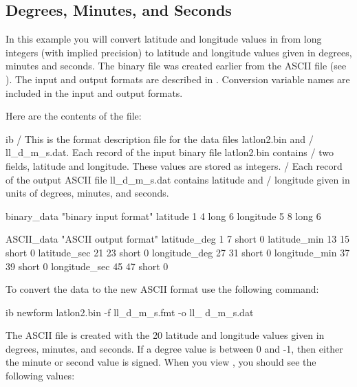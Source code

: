 \subsection{Degrees, Minutes, and Seconds}
\label{ff,convvars,dms}


In this example you will convert latitude and longitude values in
 from long integers (with implied precision) to
latitude and longitude values given in degrees, minutes and seconds.
The binary file  was created earlier from the ASCII
file  (see ). The input and
output formats are described in . Conversion
variable names are included in the input and output formats.

Here are the contents of the  file:

\begin{vcode}{ib}
/ This is the format description file for the data files latlon2.bin and
/ ll_d_m_s.dat. Each record of the input binary file latlon2.bin contains 
/ two fields, latitude and longitude. These values are stored as integers.
/ Each record of the output ASCII file ll_d_m_s.dat contains latitude and 
/ longitude given in units of degrees, minutes, and seconds.

binary_data "binary input format"
latitude 1 4 long 6
longitude 5 8 long 6

ASCII_data "ASCII output format"
latitude_deg 1 7 short 0
latitude_min 13 15 short 0
latitude_sec 21 23 short 0
longitude_deg 27 31 short 0
longitude_min 37 39 short 0
longitude_sec 45 47 short 0 
\end{vcode}

To convert the data to the new ASCII format use the following command: 

\begin{vcode}{ib}
newform latlon2.bin -f ll_d_m_s.fmt -o ll_ d_m_s.dat 
\end{vcode}

The ASCII file  is created with the 20 latitude and
longitude values given in degrees, minutes, and seconds. If a degree
value is between 0 and -1, then either the minute or second value is
signed. When you view , you should see the following
values:

